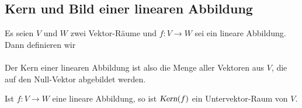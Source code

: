 \subsection{Kern und Bild einer linearen Abbildung}
\begin{Definition}[Kern]
  Es seien $V$ und $W$ zwei Vektor-R\"{a}ume und $f:V \rightarrow W$ sei ein lineare Abbildung.  Dann definieren wir 
  \\[0.2cm]
  \hspace*{1.3cm}
  \colorbox{red}{}
  \\[0.2cm] 
  Der Kern einer linearen Abbildung ist also die Menge aller Vektoren aus $V$, die auf den Null-Vektor abgebildet werden.  \eoxs
\end{Definition}

\begin{Satz}
  Ist $f:V \rightarrow W$ eine lineare Abbildung, so ist $\textsl{Kern}(f)$ ein Untervektor-Raum von $V$.
\end{Satz}

